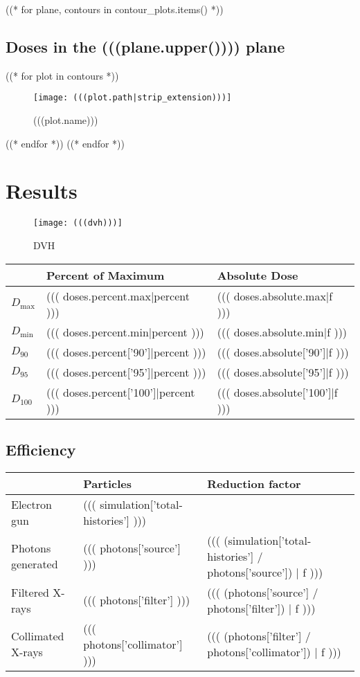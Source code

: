 \documentclass[12pt]{article}
\begin{document}

((* for plane, contours in contour_plots.items() *))
	\subsection{Doses in the (((plane.upper()))) plane}
	((* for plot in contours *))
	\begin{figure}[H]
	\centering
	\texttt{[image: (((plot.path|strip\_extension)))]}
	\caption{(((plot.name)))}
	\end{figure}
	((* endfor *))
((* endfor *))

\section{Results}

\begin{figure}[H]
\centering
\texttt{[image: (((dvh)))]}
\caption{DVH}
\end{figure}

\begin{table}[H]
\begin{tabular}{l l l}
	& Percent of Maximum & Absolute Dose \\
	\hline
	$D_{\mathrm{max}}$ & ((( doses.percent.max|percent ))) & ((( doses.absolute.max|f ))) \\
	$D_{\mathrm{min}}$ & ((( doses.percent.min|percent ))) & ((( doses.absolute.min|f ))) \\
	$D_{90}$ & ((( doses.percent['90']|percent ))) & ((( doses.absolute['90']|f ))) \\
	$D_{95}$ & ((( doses.percent['95']|percent ))) & ((( doses.absolute['95']|f ))) \\
	$D_{100}$ & ((( doses.percent['100']|percent ))) & ((( doses.absolute['100']|f )))
\end{tabular}
\end{table}

\subsection{Efficiency}

\begin{table}[H]
\begin{tabular}{l l l}
	& Particles & Reduction factor \\
	\hline
	Electron gun & ((( simulation['total-histories'] ))) & \\
	Photons generated & ((( photons['source'] ))) & ((( (simulation['total-histories'] / photons['source']) | f ))) \\
	Filtered X-rays & ((( photons['filter'] ))) & ((( (photons['source'] / photons['filter']) | f ))) \\
	Collimated X-rays & ((( photons['collimator'] ))) & ((( (photons['filter'] / photons['collimator']) | f )))
\end{tabular}
\end{table}
\end{document}
